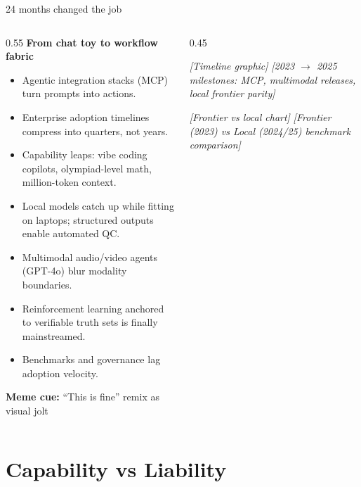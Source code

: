 \documentclass[10pt, aspectratio=169]{beamer}
\newcommand{\placeholder}[1]{\textit{[#1]}}
\newcommand{\memecue}[1]{\textcolor{aauDarkBlue}{\textbf{Meme cue:} #1}}
\begin{document}
\begin{frame}{24 months changed the job}
  \begin{columns}[T]
    \begin{column}{0.55\textwidth}
      \textbf{From chat toy to workflow fabric}
      \begin{itemize}
        \item Agentic integration stacks (MCP) turn prompts into actions.
        \item Enterprise adoption timelines compress into quarters, not years.
        \item Capability leaps: vibe coding copilots, olympiad-level math, million-token context.
        \item Local models catch up while fitting on laptops; structured outputs enable automated QC.
        \item Multimodal audio/video agents (GPT-4o) blur modality boundaries.
        \item Reinforcement learning anchored to verifiable truth sets is finally mainstreamed.
        \item Benchmarks and governance lag adoption velocity.
      \end{itemize}
      \memecue{``This is fine'' remix as visual jolt}
    \end{column}
    \begin{column}{0.45\textwidth}
      \begin{block}{\placeholder{Timeline graphic}}
        \centering
        \placeholder{2023 $\rightarrow$ 2025 milestones: MCP, multimodal releases, local frontier parity}
      \end{block}
      \vspace{0.5em}
      \begin{block}{\placeholder{Frontier vs local chart}}
        \centering
        \placeholder{Frontier (2023) vs Local (2024/25) benchmark comparison}
      \end{block}
    \end{column}
  \end{columns}
  \vfill
  \small \parencite{mcp_site,anthropic_mcp,windows_mcp,phi3_blog,gpt4o_release,claude35_sonnet,gemini_longcontext}
\end{frame}

\section{Capability vs Liability}
\end{document}
